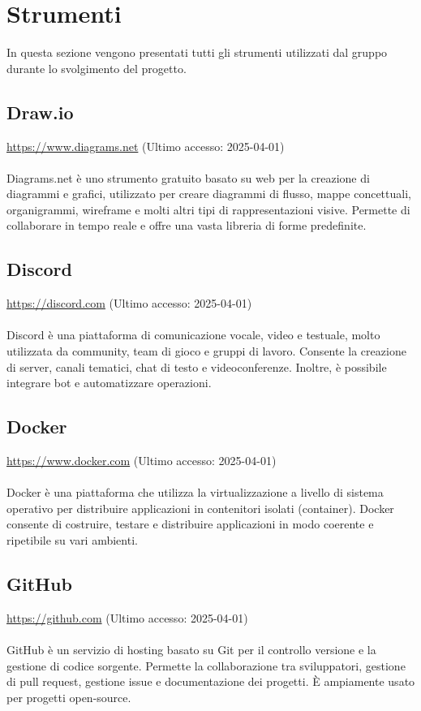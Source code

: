 \section{Strumenti}
In questa sezione vengono presentati tutti gli strumenti utilizzati dal gruppo durante lo svolgimento del progetto.

\subsection{Draw.io}
\label{Diagrams.net}
\href{https://www.diagrams.net}{https://www.diagrams.net} (Ultimo accesso: 2025-04-01) \\ \\  
Diagrams.net è uno strumento gratuito basato su web per la creazione di diagrammi e grafici, utilizzato per creare diagrammi di flusso, mappe concettuali, organigrammi, wireframe e molti altri tipi di rappresentazioni visive. Permette di collaborare in tempo reale e offre una vasta libreria di forme predefinite.

\subsection{Discord}
\label{Discord}
\href{https://discord.com}{https://discord.com} (Ultimo accesso: 2025-04-01) \\ \\  
Discord è una piattaforma di comunicazione vocale, video e testuale, molto utilizzata da community, team di gioco e gruppi di lavoro. Consente la creazione di server, canali tematici, chat di testo e videoconferenze. Inoltre, è possibile integrare bot e automatizzare operazioni.

\subsection{Docker}
\label{Docker}
\href{https://www.docker.com}{https://www.docker.com} (Ultimo accesso: 2025-04-01) \\ \\  
Docker è una piattaforma che utilizza la virtualizzazione a livello di sistema operativo per distribuire applicazioni in contenitori isolati (container). Docker consente di costruire, testare e distribuire applicazioni in modo coerente e ripetibile su vari ambienti.

\subsection{GitHub}
\label{GitHub}
\href{https://github.com}{https://github.com} (Ultimo accesso: 2025-04-01) \\ \\  
GitHub è un servizio di hosting basato su Git per il controllo versione e la gestione di codice sorgente. Permette la collaborazione tra sviluppatori, gestione di pull request, gestione issue e documentazione dei progetti. È ampiamente usato per progetti open-source.

